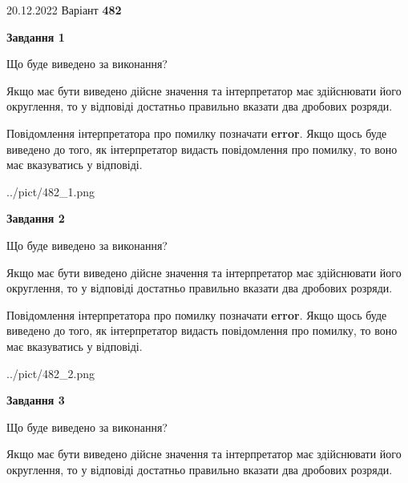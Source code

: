 \documentclass[12pt, ukrainian]{article}
\begin{document}
{20.12.2022 Варіант \No \textbf { 482 }\par}
{
\begin {Large}

{\begin {center}\textbf{Завдання 1}\end {center}}\par
Що буде виведено за виконання? \par

Якщо має бути виведено дійсне значення та інтерпретатор має здійснювати його округлення, 
то у відповіді достатньо правильно вказати два дробових розряди.

Повідомлення інтерпретатора про помилку позначати \textbf{error}.
Якщо щось буде виведено до того, як інтерпретатор видасть повідомлення про помилку, 
то воно має вказуватись у відповіді. \par

\begin{center}
	{../pict/482_1.png}
\end{center}
\newpage

{\begin {center}\textbf{Завдання 2}\end {center}}\par
Що буде виведено за виконання? \par

Якщо має бути виведено дійсне значення та інтерпретатор має здійснювати його округлення, 
то у відповіді достатньо правильно вказати два дробових розряди.

Повідомлення інтерпретатора про помилку позначати \textbf{error}.
Якщо щось буде виведено до того, як інтерпретатор видасть повідомлення про помилку, 
то воно має вказуватись у відповіді. \par

\begin{center}
	{../pict/482_2.png}
\end{center}
\newpage

{\begin {center}\textbf{Завдання 3}\end {center}}\par
Що буде виведено за виконання? \par

Якщо має бути виведено дійсне значення та інтерпретатор має здійснювати його округлення, 
то у відповіді достатньо правильно вказати два дробових розряди.


\end{Large}}
\end{document}
